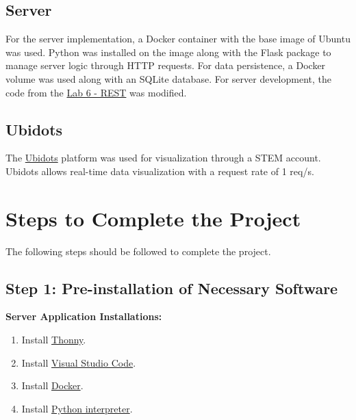 \documentclass{article}
\begin{document}
\subsection{Server}
For the server implementation, a Docker container with the base image of Ubuntu was used. 
Python was installed on the image along with the Flask package to manage server logic through HTTP requests. 
For data persistence, a Docker volume was used along with an SQLite database.
For server development, the code from the \href{https://pmanzoni.notion.site/LAB-6-REST-d487dab1b7e24d56b31d8e552a480888}{Lab 6 - REST} \cite{manzoni2024lab6} was modified.

\subsection{Ubidots}
The \href{https://stem.ubidots.com/}{Ubidots} platform was used for visualization through a STEM account. Ubidots allows real-time data visualization with a request rate of 1 req/s.

\section{Steps to Complete the Project}
The following steps should be followed to complete the project.
\subsection{Step 1: Pre-installation of Necessary Software}
\textbf{Server Application Installations:}
\begin{enumerate}
    \item Install \href{https://thonny.org/}{Thonny}.
    \item Install \href{https://code.visualstudio.com/download}{Visual Studio Code}.
    \item Install \href{https://docs.docker.com/get-docker/}{Docker}.
    \item Install \href{https://kinsta.com/es/base-de-conocimiento/instalar-python/}{Python interpreter}.
\end{enumerate}
\end{document}
